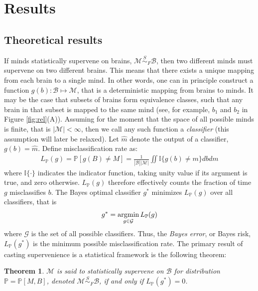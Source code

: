 \documentclass{article}
\newcommand{\mB}{\mathcal{B}}
\newcommand{\mM}{\mathcal{M}}
\newcommand{\PP}{\mathbb{P}}           %
\newcommand{\II}{\mathbb{I}}           %
\providecommand{\mc}[1]{\mathcal{#1}}
\providecommand{\mh}[1]{\widehat{#1}}
\newcommand{\argmin}{\operatornamewithlimits{argmin}}
\newcommand{\MsB}{\mM \overset{S}{\sim}_F \mB}
\newtheorem{thm}{Theorem}
\begin{document}


\section{Results}

\subsection{Theoretical results} %
\label{sub:theoretical_results}

If minds statistically supervene on brains, $\MsB$, then two different minds must supervene on two different brains.  This means that there exists a unique mapping from each brain to a single mind.  In other words, one can in principle construct a function $g(b): \mB \mapsto \mM$, that is a deterministic mapping from brains to minds.  It may be the case that subsets of brains form equivalence classes, such that any brain in that subset is mapped to the same mind (see, for example, $b_1$ and $b_2$ in Figure \ref{fig:rel}(A)).  Assuming for the moment that the space of all possible minds is finite, that is $| \mM| < \infty$, then we call any such function a \emph{classifier} (this assumption will later be relaxed).  Let $\mh{m}$ denote the output of a classifier, $g(b)=\mh{m}$.  Define misclassification rate as:
\begin{align}
	L_{\PP}(g) = \PP[g(B) \neq M] = \frac{1}{|\mB| |\mM|}\iint \II\{g(b)\neq m\} db dm
\end{align}
where $\II\{\cdot\}$ indicates the indicator function, taking unity value if its argument is true, and zero otherwise.  $L_{\PP}(g)$ therefore effectively counts the fraction of time $g$ misclassifies $b$. The Bayes optimal classifier $g^*$ minimizes $L_{\PP}(g)$ over all classifiers, that is
\begin{align}
	g^* = \argmin_{g \in \mc{G}} L_{\PP}(g)
\end{align}
where $\mc{G}$ is the set of all possible classifiers.  Thus, the \emph{Bayes error}, or Bayes risk, $L_{\PP}(g^*)$ is the minimum possible misclassification rate. The primary result of casting supervenience is a statistical framework is the following theorem: 
\begin{thm}
\label{thm1} 
$\mM$ is said to \textit{statistically supervene} on $\mB$ for distribution $\PP=\PP[M,B]$, denoted $\mM \overset{S}{\sim}_F \mB$, if and only if $L_{\PP}(g^*) = 0$.
\end{thm}
\end{document}
